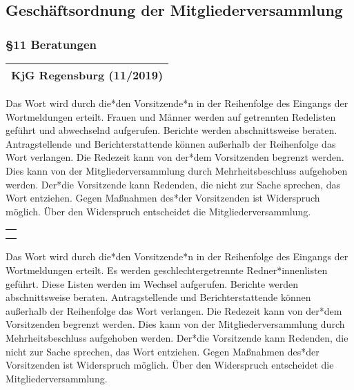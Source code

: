 \documentclass[12pt]{report}
\newcounter{tablecounter}
\newcommand\showcounter{\addtocounter{tablecounter}{1}\thetablecounter}
\begin{document}
\begin{flushleft}
\chapter*{Geschäftsordnung der Mitgliederversammlung}

\subsection*{§11 Beratungen}

\begin{table}[H]
 \begin{tabular}{|l|}
  \hline
  \rowcolor[HTML]{FFCC67} 
  \rule[-1ex]{0pt}{4ex} \textbf{KjG Regensburg (11/2019)}     \hspace{0.6\textwidth} \showcounter        \\ \hline
 \end{tabular}
\end{table}

Das Wort wird durch die*den Vorsitzende*n in der Reihenfolge des Eingangs der Wortmeldungen erteilt.
Frauen und Männer werden auf getrennten Redelisten geführt und abwechselnd aufgerufen. Berichte werden
abschnittsweise beraten. Antragstellende und Berichterstattende können außerhalb der Reihenfolge das
Wort verlangen. Die Redezeit kann von der*dem Vorsitzenden begrenzt werden. Dies kann von der 
Mitgliederversammlung durch Mehrheitsbeschluss aufgehoben werden. Der*die Vorsitzende kann Redenden, die
nicht zur Sache sprechen, das Wort entziehen. Gegen Maßnahmen des*der Vorsitzenden ist Widerspruch
möglich. Über den Widerspruch entscheidet die Mitgliederversammlung.

\begin{table}[H]
 \begin{tabular}{|l|}
  \hline
  \rowcolor[HTML]{9AFF99} 
  \rule[-1ex]{0pt}{4ex}
  \begin{minipage}[t]{\textwidth}
   \textbf{Änderung\\}  
    \end{minipage}
  \\ \hline
 \end{tabular}
\end{table}

Das Wort wird durch die*den Vorsitzende*n in der Reihenfolge des Eingangs der Wortmeldungen erteilt.
{\color{red} Es werden geschlechtergetrennte Redner*innenlisten geführt. Diese Listen werden im Wechsel aufgerufen.} Berichte werden
abschnittsweise beraten. Antragstellende und Berichterstattende können außerhalb der Reihenfolge das
Wort verlangen. Die Redezeit kann von der*dem Vorsitzenden begrenzt werden. Dies kann von der 
Mitgliederversammlung durch Mehrheitsbeschluss aufgehoben werden. Der*die Vorsitzende kann Redenden, die
nicht zur Sache sprechen, das Wort entziehen. Gegen Maßnahmen des*der Vorsitzenden ist Widerspruch
möglich. Über den Widerspruch entscheidet die Mitgliederversammlung.


\end{flushleft}
\end{document}
